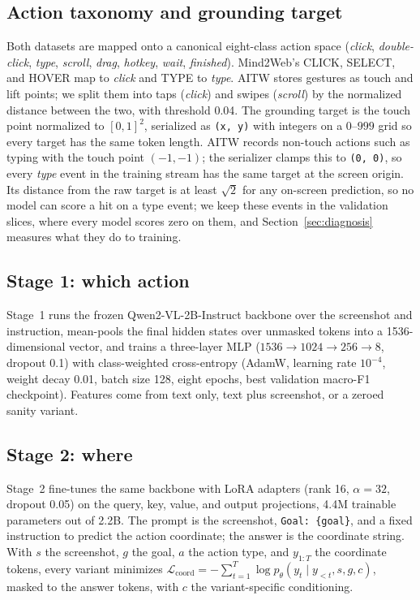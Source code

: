 \documentclass{article}
\begin{document}
\subsection{Action taxonomy and grounding target}
Both datasets are mapped onto a canonical eight-class action space (\emph{click}, \emph{double-click}, \emph{type}, \emph{scroll}, \emph{drag}, \emph{hotkey}, \emph{wait}, \emph{finished}). Mind2Web's CLICK, SELECT, and HOVER map to \emph{click} and TYPE to \emph{type}. AITW stores gestures as touch and lift points; we split them into taps (\emph{click}) and swipes (\emph{scroll}) by the normalized distance between the two, with threshold 0.04. The grounding target is the touch point normalized to $[0,1]^2$, serialized as \texttt{(x, y)} with integers on a $0$--$999$ grid so every target has the same token length. AITW records non-touch actions such as typing with the touch point $(-1,-1)$; the serializer clamps this to \texttt{(0, 0)}, so every \emph{type} event in the training stream has the same target at the screen origin. Its distance from the raw target is at least $\sqrt{2}$ for any on-screen prediction, so no model can score a hit on a type event; we keep these events in the validation slices, where every model scores zero on them, and Section~\ref{sec:diagnosis} measures what they do to training.

\subsection{Stage 1: which action}
Stage~1 runs the frozen Qwen2-VL-2B-Instruct backbone over the screenshot and instruction, mean-pools the final hidden states over unmasked tokens into a 1536-dimensional vector, and trains a three-layer MLP ($1536 \to 1024 \to 256 \to 8$, dropout 0.1) with class-weighted cross-entropy (AdamW, learning rate $10^{-4}$, weight decay 0.01, batch size 128, eight epochs, best validation macro-F1 checkpoint). Features come from text only, text plus screenshot, or a zeroed sanity variant.

\subsection{Stage 2: where}
Stage~2 fine-tunes the same backbone with LoRA adapters (rank 16, $\alpha=32$, dropout 0.05) on the query, key, value, and output projections, 4.4M trainable parameters out of 2.2B. The prompt is the screenshot, \texttt{Goal: \{goal\}}, and a fixed instruction to predict the action coordinate; the answer is the coordinate string. With $s$ the screenshot, $g$ the goal, $a$ the action type, and $y_{1:T}$ the coordinate tokens, every variant minimizes $\mathcal{L}_{\mathrm{coord}} = -\sum_{t=1}^{T} \log p_\theta(y_t \mid y_{<t}, s, g, c)$, masked to the answer tokens, with $c$ the variant-specific conditioning.
\end{document}
